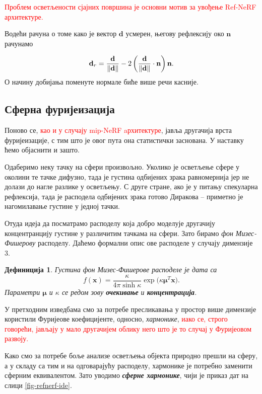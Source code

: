 \documentclass[12pt, a4paper, twoside]{book}
\numberwithin{equation}{chapter}
\numberwithin{theorem}{section}
\newtheorem{definition}{Дефиниција}
\numberwithin{definition}{section}
\numberwithin{definitionChapter}{chapter}
\begin{document}
\textcolor{red}{Проблем осветљености сјајних површина је основни мотив за увођење Ref-NeRF архитектуре. }

Водећи рачуна о томе како је вектор $\textbf{d}$ усмерен, његову рефлексију око $\textbf{n}$ рачунамо

	\begin{equation}
		\textbf{d}_r = \frac{\textbf{d}}{\left\Vert\mathbf{d}\right\Vert}
		-2\left(\frac{\textbf{d}}{\left\Vert\mathbf{d}\right\Vert} \cdot
			\boldsymbol{\textbf{n}}\right)\textbf{\text{n}}
		\label{eqn-reflection}.
	\end{equation}
О начину добијања поменуте нормале биће више речи касније.

\subsection{Сферна фуријеизација}
Поново се, \textcolor{red}{као и у случају mip-NeRF aрхитектуре}, јавља другачија врста фуријеизације, с тим што је овог пута она статистички
заснована. У наставку ћемо објаснити и зашто.

Одаберимо неку тачку на сфери произвољно. Уколико је осветљење сфере у околини те тачке дифузно, тада је
густина одбијених зрака равномернија јер не долази до нагле разлике у осветљењу. С друге стране,
ако је у питању спекуларна рефлексија, тада је расподела одбијених зрака готово Диракова -- приметно
је нагомилавање густине у једној тачки.

Отуда идеја да посматрамо расподелу која добро моделује другачију концентранцију густине у различитим
тачкама на сфери. Зато бирамо \textit{фон Мизес-Фишерову} расподелу. Даћемо формални опис ове
расподеле у случају димензије 3.

	\begin{definition}
		Густина фон Мизес-Фишерове расподеле је дата са
		$$f(\textbf{x}) = \frac{\kappa}{4\pi \sinh\kappa} \exp(\kappa\boldsymbol{\mu}^T\textbf{x)}.$$
		Параметри $\boldsymbol{\mu}$ и $\kappa$ се редом зову \textbf{очекивање} и \textbf{концентрација}.
	\end{definition}

У претходним изведбама смо за потребе пресликавања у простор  више димензије користили Фуријеове коефицијенте,
односно, \textit{хармонике}, \textcolor{red}{иако се, строго говорећи, јављају у мало другачијем облику него што је то
случај у Фуријеовом развоју.}

Како смо за потребе боље анализе осветљења објекта природно прешли на сферу, а у складу са тим и на одговарајућу
расподелу, хармонике је потребно заменити сферним еквивалентом. Зато уводимо \textbf{\textit{сферне хармонике}}, чији
је приказ дат на слици \ref{fig-refnerf-ide}.
\end{document}
